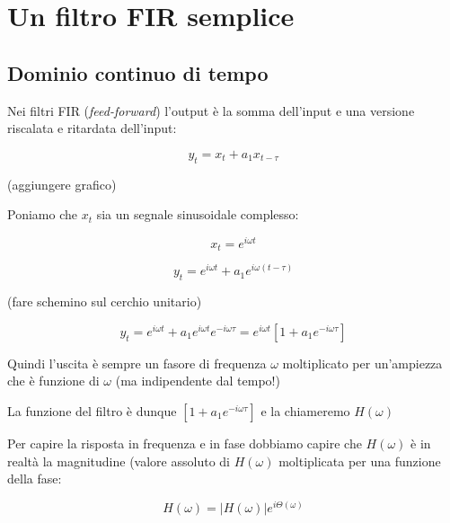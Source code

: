 %
%

\section{Un filtro FIR semplice\label{sec:simple fir}}

\subsection{Dominio continuo di tempo\label{sec:continuous time}}

Nei filtri FIR (\emph{feed-forward}) l'output \`e la somma dell'input e una versione riscalata e ritardata
		dell'input:

		\begin{equation}\label{eqn:fir semplice}
						y_t = x_t + a_1 x_{t-\tau}
			\end{equation}

		(aggiungere grafico)

	Poniamo che $x_t$ sia un segnale sinusoidale complesso:

		 \begin{equation}
	    x_t = e^{i\omega t}\nonumber
		 \end{equation}

		 \begin{equation}
			y_t = e^{i \omega t} + a_1 e^{i \omega (t - \tau)}
		 \end{equation}

		(fare schemino sul cerchio unitario)

		 \begin{equation}
		  y_t = e^{i \omega t} + a_1 e^{i \omega t} e^{-i \omega \tau} = e^{i\omega t} \left [ 1 + a_1 e^{-i \omega \tau} \right ]
		 \end{equation}

	Quindi l'uscita \`e sempre un fasore di frequenza $\omega$ moltiplicato per
		un'ampiezza che \`e funzione di $\omega$ (ma indipendente dal tempo!)

	La funzione del filtro \`e dunque $\left [ 1 + a_1 e^{-i \omega \tau} \right ]$ e la chiameremo $H(\omega)$

	Per capire la risposta in frequenza e in fase dobbiamo capire che $H(\omega)$ \`e
		in realt\`a la magnitudine (valore assoluto di $H(\omega)$ moltiplicata per una
		funzione della fase:

		 \begin{equation}
		  H(\omega) = |H(\omega)| e^{i \Theta(\omega)}
		 \end{equation}

